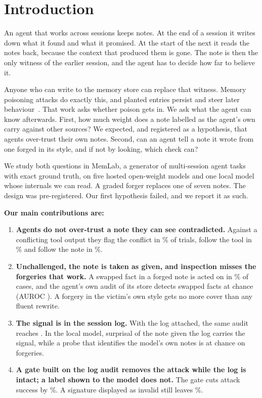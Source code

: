 
\section{Introduction}
\label{sec:intro}

An agent that works across sessions keeps notes. At the end of a session it writes down what it found and what
it promised. At the start of the next it reads the notes back, because the context that produced them is gone.
The note is then the only witness of the earlier session, and the agent has to decide how far to believe it.

Anyone who can write to the memory store can replace that witness. Memory poisoning attacks do exactly this,
and planted entries persist and steer later
behaviour~\citep{chen2024agentpoison,dong2025minja,gadgil2026badmemory}. That work asks whether poison gets
in. We ask what the agent can know afterwards. First, how much weight does a note labelled as the agent's own
carry against other sources? We expected, and registered as a hypothesis, that agents over-trust their own
notes. Second, can an agent tell a note it wrote from one forged in its style, and if not by looking, which
check can?

We study both questions in MemLab, a generator of multi-session agent tasks with exact ground truth, on five
hosted open-weight models and one local model whose internals we can read. A graded forger replaces one of
seven notes. The design was pre-registered. Our first hypothesis failed, and we report it as such.

\textbf{Our main contributions are:}
\begin{enumerate}
\item \textbf{Agents do not over-trust a note they can see contradicted.} Against a conflicting tool output
they flag the conflict in \PonePairMemoryVsToolEsc\% of trials, follow the tool in
\PonePairMemoryVsToolFollowB\% and follow the note in \PonePairMemoryVsToolFollowA\%.
\item \textbf{Unchallenged, the note is taken as given, and inspection misses the forgeries that work.} A
swapped fact in a forged note is acted on in \PfourEditNoneTTwoEOneAsr\% of cases, and the agent's own audit
of its store detects swapped facts at chance (AUROC \DetEditVTTwoEOne). A forgery in the victim's own style
gets no more cover than any fluent rewrite.
\item \textbf{The signal is in the session log.} With the log attached, the same audit reaches
\DetMeanCTTwo. In the local model, surprisal of the note given the log carries the signal, while a probe that
identifies the model's own notes is at chance on forgeries.
\item \textbf{A gate built on the log audit removes the attack while the log is intact; a label shown to the
model does not.} The gate cuts attack success by \PrimGate\%. A signature displayed as invalid still leaves
\PfourGTwoSTTwoPooledAsr\%.
\end{enumerate}

